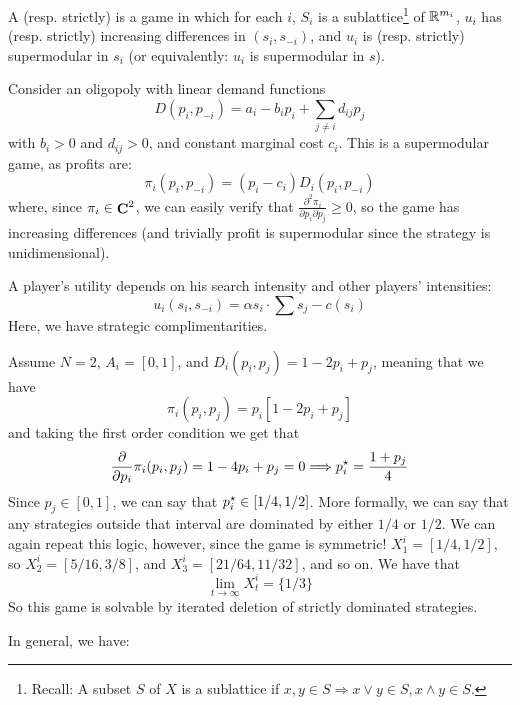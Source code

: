 \documentclass[10pt]{article}
\begin{document}
\begin{definition}
	A (resp. strictly)  is a game in which for each $i$, $S_i$ is a sublattice\footnote{Recall: A subset $S$ of $X$ is a sublattice if $x,y \in S \Longrightarrow x \vee y \in S,x \wedge y \in S$.} of $\mathbb{R}^{m_i}$, $u_i$ has (resp. strictly) increasing differences in $(s_i,s_{-i})$, and $u_i$ is (resp. strictly) supermodular in $s_i$ (or equivalently: $u_i$ is supermodular in $s$).
\end{definition}

\begin{example}
	 Consider an oligopoly with linear demand functions \[D(p_i,p_{-i}) = a_i - b_ip_i + \sum_{j\ne i} d_{ij}p_j\]with $b_i > 0$ and $d_{ij} > 0$, and constant marginal cost $c_i$. This is a supermodular game, as profits are:\[\pi_i(p_i,p_{-i}) = (p_i - c_i)D_i(p_i,p_{-i})\]where, since $\pi_i \in \mathop{\bf C}^2$, we can easily verify that $\frac{\partial^2 \pi_i}{\partial p_i \partial p_j} \ge 0$, so the game has increasing differences (and trivially profit is supermodular since the strategy is unidimensional).
\end{example}

\begin{example}
	 A player's utility depends on his search intensity and other players' intensities:\[u_i(s_i,s_{-i}) = \alpha s_i \cdot \sum s_j - c(s_i)\]Here, we have strategic complimentarities.
\end{example}


\begin{example}
	 Assume $N = 2$, $A_i = [0,1]$, and $D_i(p_i,p_j) = 1 - 2p_i + p_j$, meaning that we have \[\pi_i(p_i,p_j) = p_i[1-2p_i+p_j] \]and taking the first order condition we get that \[\frac{\partial}{\partial p_i}\pi_i(p_i,p_j) = 1-4p_i + p_j = 0 \Longrightarrow p_i^\star = \frac{1+p_j}{4}\]Since $p_j \in [0,1]$, we can say that $p_i^\star \in [1/4,1/2]$. More formally, we can say that any strategies outside that interval are dominated by either $1/4$ or $1/2$. We can again repeat this logic, however, since the game is symmetric! $X^i_1 = [1/4,1/2]$, so $X^i_2 = [5/16,3/8]$, and $X^i_3 = [21/64,11/32]$, and so on. We have that \[\lim_{t\to\infty} X^i_t = \{1/3\}\]So this game is solvable by iterated deletion of strictly dominated strategies.
\end{example}

In general, we have:
\end{document}

